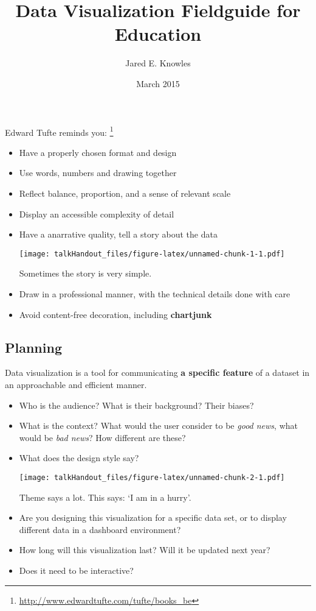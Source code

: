 \documentclass{tufte-handout}
\title{Data Visualization Fieldguide for Education}
\author{Jared E. Knowles}
\date{March 2015}
\begin{document}
\maketitle



Edward Tufte reminds you: \footnote{\url{http://www.edwardtufte.com/tufte/books_be}}

\begin{itemize}
\itemsep1pt\parskip0pt
\item
  Have a properly chosen format and design
\item
  Use words, numbers and drawing together
\item
  Reflect balance, proportion, and a sense of relevant scale
\item
  Display an accessible complexity of detail
\item
  Have a anarrative quality, tell a story about the data

  \begin{marginfigure}
   \texttt{[image: talkHandout\_files/figure-latex/unnamed-chunk-1-1.pdf]}
  \caption{Sometimes the story is very simple.}
  \end{marginfigure}
\item
  Draw in a professional manner, with the technical details done with
  care
\item
  Avoid content-free decoration, including \textbf{chartjunk}
\end{itemize}

\subsection{Planning}\label{planning}

Data visualization is a tool for communicating \textbf{a specific
feature} of a dataset in an approachable and efficient
manner.

\begin{itemize}
\itemsep1pt\parskip0pt
\item
  Who is the audience? What is their background? Their biases?
\item
  What is the context? What would the user consider to be \emph{good
  news}, what would be \emph{bad news}? How different are these?
\item
  What does the design style say?

  \begin{marginfigure}
   \texttt{[image: talkHandout\_files/figure-latex/unnamed-chunk-2-1.pdf]}
  \caption{Theme says a lot. This says: `I am in a hurry'.}
  \end{marginfigure}
\item
  Are you designing this visualization for a specific data set, or to
  display different data in a dashboard environment?
\item
  How long will this visualization last? Will it be updated next year?
\item
  Does it need to be interactive?
\end{itemize}
\end{document}
